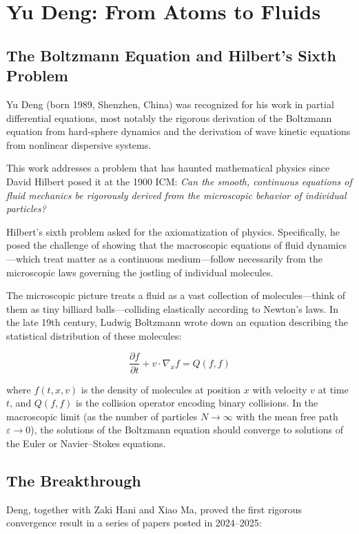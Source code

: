 \section{Yu Deng: From Atoms to Fluids}

\subsection{The Boltzmann Equation and Hilbert's Sixth Problem}
Yu Deng (born 1989, Shenzhen, China) was recognized for his work in partial differential equations, most notably the rigorous derivation of the Boltzmann equation from hard-sphere dynamics and the derivation of wave kinetic equations from nonlinear dispersive systems.

This work addresses a problem that has haunted mathematical physics since David Hilbert posed it at the 1900 ICM: \emph{Can the smooth, continuous equations of fluid mechanics be rigorously derived from the microscopic behavior of individual particles?}

\begin{historicalbox}
Hilbert's sixth problem asked for the axiomatization of physics. Specifically, he posed the challenge of showing that the macroscopic equations of fluid dynamics---which treat matter as a continuous medium---follow necessarily from the microscopic laws governing the jostling of individual molecules.
\end{historicalbox}

The microscopic picture treats a fluid as a vast collection of molecules---think of them as tiny billiard balls---colliding elastically according to Newton's laws. In the late 19th century, Ludwig Boltzmann wrote down an equation describing the statistical distribution of these molecules:

\begin{equation}
\frac{\partial f}{\partial t} + v \cdot \nabla_x f = Q(f, f)
\end{equation}

where $f(t, x, v)$ is the density of molecules at position $x$ with velocity $v$ at time $t$, and $Q(f,f)$ is the collision operator encoding binary collisions. In the macroscopic limit (as the number of particles $N \to \infty$ with the mean free path $\varepsilon \to 0$), the solutions of the Boltzmann equation should converge to solutions of the Euler or Navier--Stokes equations.

\subsection{The Breakthrough}
Deng, together with Zaki Hani and Xiao Ma, proved the first rigorous convergence result in a series of papers posted in 2024--2025:

